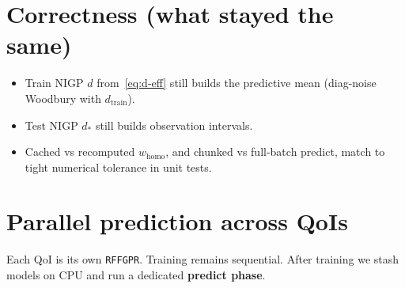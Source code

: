 \documentclass[11pt]{article}
\newcommand{\homo}{w_{\mathrm{homo}}}
\begin{document}
\FloatBarrier

\section{Correctness (what stayed the same)}

\begin{itemize}[leftmargin=1.2em,itemsep=0.25em]
  \item Train NIGP $d$ from~\eqref{eq:d-eff} still builds the predictive mean
        (diag-noise Woodbury with $d_{\mathrm{train}}$).
  \item Test NIGP $d_*$ still builds observation intervals.
  \item Cached vs recomputed $\homo$, and chunked vs full-batch predict, match to
        tight numerical tolerance in unit tests.
\end{itemize}

\section{Parallel prediction across QoIs}

Each QoI is its own \texttt{RFFGPR}. Training remains sequential. After training we
stash models on CPU and run a dedicated \textbf{predict phase}.
\end{document}
